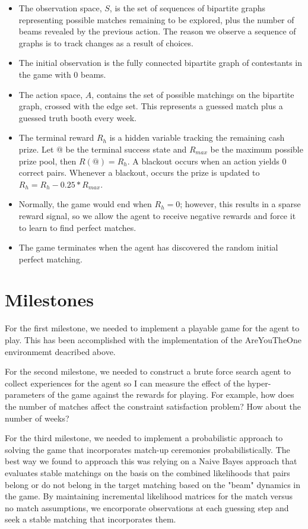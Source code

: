 \documentclass{article}
\begin{document}
\begin{itemize}
  \item The observation space, $S$, is the set of sequences of bipartite
        graphs representing possible matches remaining to be explored, plus
        the number of beams revealed by the previous action. The reason we
        observe a sequence of graphs is to track changes as a result of choices.
  \item The initial observation is the fully connected bipartite graph
        of contestants in the game with 0 beams.
  \item The action space, $A$, contains the set of possible matchings on
        the bipartite graph, crossed with the edge set. This represents a
        guessed match plus a guessed truth booth every week.
  \item The terminal reward $R_h$ is a hidden variable tracking the remaining
        cash prize. Let $@$ be the terminal success state and $R_{max}$ be the
        maximum possible prize pool, then $R(@) = R_h$. A blackout occurs when
        an action yields 0 correct pairs. Whenever a blackout, occurs the prize
        is updated to $R_h = R_h - 0.25 * R_{max}$.
  \item Normally, the game would end when $R_h = 0$; however, this results in
        a sparse reward signal, so we allow the agent to receive negative rewards
        and force it to learn to find perfect matches.
  \item The game terminates when the agent has discovered the random initial
        perfect matching.
\end{itemize}

\section{Milestones}

For the first milestone, we needed to implement a playable game for the
agent to play. This has been accomplished with the implementation of the
AreYouTheOne environmemt deacribed above.

For the second milestone, we needed to construct a brute force search agent
to collect experiences for the agent so I can measure the effect of the
hyper-parameters of the game against the rewards for playing. For example,
how does the number of matches affect the constraint satisfaction problem?
How about the number of weeks?

For the third milestone, we needed to implement a probabilistic approach to
solving the game that incorporates match-up ceremonies probabilistically.
The best way we found to approach this was relying on a Naive Bayes approach
that evaluates stable matchings on the basis on the combined likelihoods
that pairs belong or do not belong in the target matching based on the
"beam" dynamics in the game. By maintaining incremental likelihood matrices
for the match versus no match assumptions, we encorporate observations at
each guessing step and seek a stable matching that incorporates them.
\end{document}
